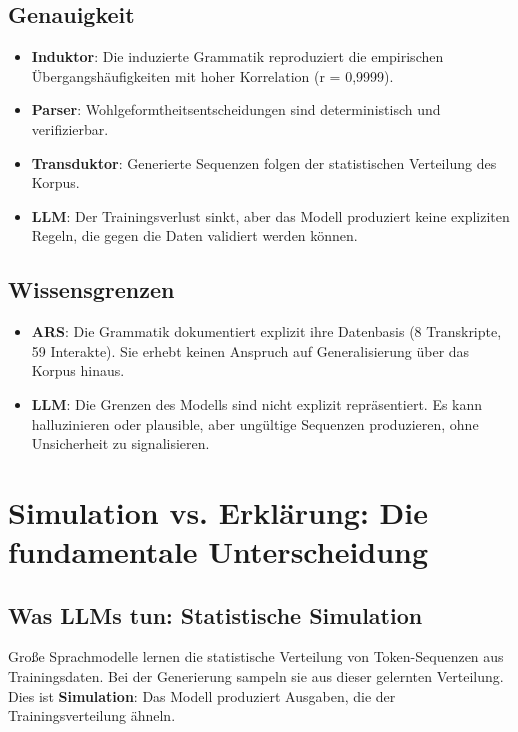 \documentclass[12pt,a4paper]{article}
\begin{document}
\subsection{Genauigkeit}

\begin{itemize}
    \item \textbf{Induktor}: Die induzierte Grammatik reproduziert die 
    empirischen Übergangshäufigkeiten mit hoher Korrelation (r = 0,9999).
    \item \textbf{Parser}: Wohlgeformtheitsentscheidungen sind deterministisch 
    und verifizierbar.
    \item \textbf{Transduktor}: Generierte Sequenzen folgen der statistischen 
    Verteilung des Korpus.
    \item \textbf{LLM}: Der Trainingsverlust sinkt, aber das Modell produziert 
    keine expliziten Regeln, die gegen die Daten validiert werden können.
\end{itemize}

\subsection{Wissensgrenzen}

\begin{itemize}
    \item \textbf{ARS}: Die Grammatik dokumentiert explizit ihre Datenbasis 
    (8 Transkripte, 59 Interakte). Sie erhebt keinen Anspruch auf 
    Generalisierung über das Korpus hinaus.
    \item \textbf{LLM}: Die Grenzen des Modells sind nicht explizit repräsentiert. 
    Es kann halluzinieren oder plausible, aber ungültige Sequenzen produzieren, 
    ohne Unsicherheit zu signalisieren.
\end{itemize}

\section{Simulation vs. Erklärung: Die fundamentale Unterscheidung}

\subsection{Was LLMs tun: Statistische Simulation}

Große Sprachmodelle lernen die statistische Verteilung von Token-Sequenzen aus 
Trainingsdaten. Bei der Generierung sampeln sie aus dieser gelernten Verteilung. 
Dies ist \textbf{Simulation}: Das Modell produziert Ausgaben, die der 
Trainingsverteilung ähneln.
\end{document}
